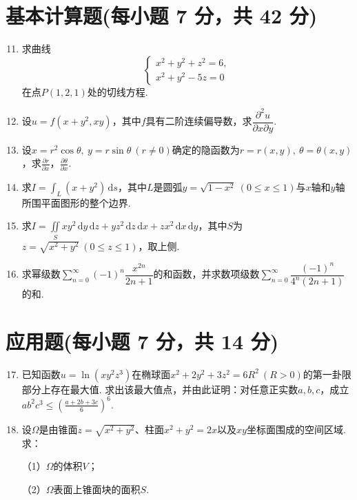\documentclass[../main.tex]{subfiles}
\begin{document}
\section{基本计算题(每小题 7 分，共 42 分)}
\begin{enumerate}
    \setcounter{enumi}{10}
    \item 求曲线
          \[
              \begin{cases}
                  x^2+y^2+z^2=6, \\
                  x^2+y^2-5z=0
              \end{cases}
          \]
          在点$P(1,2,1)$处的切线方程.
          \vspace{11em}

    \item 设$u=f(x+y^2,xy)$，其中$f$具有二阶连续偏导数，求$\dfrac{\partial^2u}{\partial x\partial y}$.
          \vspace{9em}

    \item 设$x=r^2\cos\theta,\ y=r\sin\theta\ (r\neq0)$确定的隐函数为$r=r(x,y),\ \theta=\theta(x,y)$，求$\frac{\partial r}{\partial x}$，$\frac{\partial\theta}{\partial x}$.
          \vspace{9em}

    \item 求$I=\displaystyle\int_L(x+y^2)\,\mathrm{d}s$，其中$L$是圆弧$y=\sqrt{1-x^2}\ (0\leq x\leq1)$与$x$轴和$y$轴所围平面图形的整个边界.
          \vspace{9em}

    \item 求$I=\iint\limits_S xy^2\,\mathrm{d}y\,\mathrm{d}z+yz^2\,\mathrm{d}z\,\mathrm{d}x+zx^2\,\mathrm{d}x\,\mathrm{d}y$，其中$S$为$z=\sqrt{x^2+y^2}\ (0\leq z\leq1)$，取上侧.
          \vspace{10em}

    \item 求幂级数$\displaystyle\sum_{n=0}^{\infty}(-1)^n\dfrac{x^{2n}}{2n+1}$的和函数，并求数项级数$\displaystyle\sum_{n=0}^{\infty}\dfrac{(-1)^n}{4^n(2n+1)}$的和.
          \vspace{10em}
\end{enumerate}

\section{应用题(每小题 7 分，共 14 分)}
\begin{enumerate}
    \setcounter{enumi}{16}
    \item 已知函数$u=\ln(xy^2z^3)$在椭球面$x^2+2y^2+3z^2=6R^2\ (R>0)$的第一卦限部分上存在最大值. 求出该最大值点，并由此证明：对任意正实数$a,b,c$，成立$ab^2c^3\leq\left(\frac{a+2b+3c}{6}\right)^6$.
          \vspace{9em}

    \item 设$\Omega$是由锥面$z=\sqrt{x^2+y^2}$、柱面$x^2+y^2=2x$以及$xy$坐标面围成的空间区域. 求：

          （1）$\Omega$的体积$V$；

          （2）$\Omega$表面上锥面块的面积$S$.
          \vspace{9em}
\end{enumerate}
\end{document}
